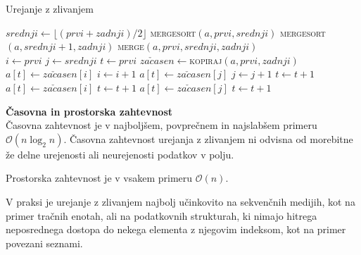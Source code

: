 \documentclass[a4paper,oneside,12pt]{article}
\newcommand{\subsubsubsection}[1]{\vspace*{1ex}\textbf{#1}\\}
\begin{document}
\begin{algorithm}[h!t!]
  \caption{Urejanje z zlivanjem}\label{algo:mergesort}
  \begin{algorithmic}[1]
         \Return \EndIf
        \State $srednji \gets \lfloor(prvi + zadnji) / 2\rfloor$
        \State \textsc{mergesort}$(a, prvi, srednji)$
        \State \textsc{mergesort}$(a, srednji + 1, zadnji)$
        \State \textsc{merge}$(a, prvi, srednji, zadnji)$
    \EndFunction
    \\
        \State $i \gets prvi$
        \State $j \gets srednji$
        \State $t \gets prvi$
        \State $za\check{c}asen \gets$\textsc{kopiraj}$(a, prvi, zadnji)$ 
                \State $a[t] \gets za\check{c}asen[i]$
                \State $i \gets i + 1$
            \Else
                \State $a[t] \gets za\check{c}asen[j]$
                \State $j \gets j + 1$
            \EndIf
            \State $t \gets t + 1$
        \EndWhile
            \State $a[t] \gets za\check{c}asen[i]$
            \State $t \gets t + 1$
        \EndWhile
            \State $a[t] \gets za\check{c}asen[j]$
            \State $t \gets t + 1$
        \EndWhile
    \EndFunction
  \end{algorithmic}
\end{algorithm}

\subsubsubsection{Časovna in prostorska zahtevnost} \nopagebreak
Časovna zahtevnost je v najboljšem, povprečnem in najslabšem primeru 
$\mathcal{O}(n\log_2 n)$. Časovna zahtevnost urejanja z zlivanjem ni odvisna od
morebitne že delne urejenosti ali neurejenosti podatkov v polju. 

Prostorska zahtevnost je v vsakem primeru $\mathcal{O}(n)$. %

V praksi je urejanje z zlivanjem najbolj učinkovito na
sekvenčnih medijih, kot na primer tračnih enotah, ali na podatkovnih strukturah, ki nimajo hitrega
neposrednega dostopa do nekega elementa z njegovim indeksom, kot na primer povezani seznami.
\end{document}
